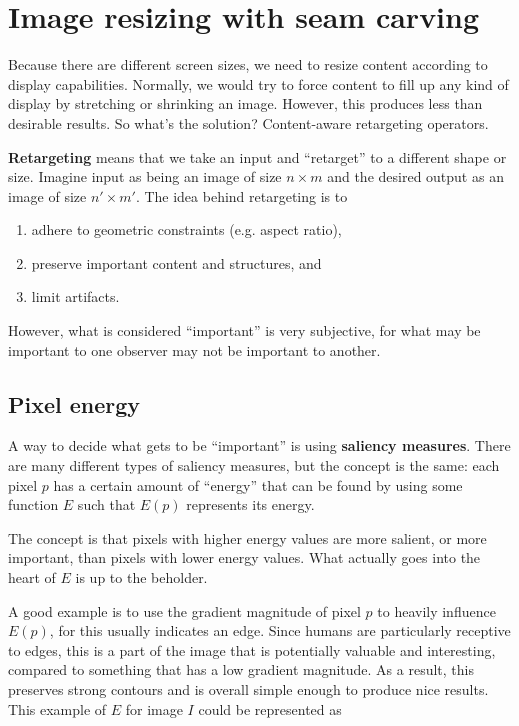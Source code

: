 \documentclass{article}
\begin{document}
\section{Image resizing with seam carving}
Because there are different screen sizes, we need to resize content according to display capabilities. Normally, we would try to force content to fill up any kind of display by stretching or shrinking an image. However, this produces less than desirable results. So what's the solution? Content-aware retargeting operators.

\textbf{Retargeting} means that we take an input and ``retarget'' to a different shape or size. Imagine input as being an image of size $n \times m$ and the desired output as an image of size $n' \times m'$. The idea behind retargeting is to
\begin{enumerate}
	\item adhere to geometric constraints (e.g. aspect ratio),
	\item preserve important content and structures, and
	\item limit artifacts.
\end{enumerate}
However, what is considered ``important'' is very subjective, for what may be important to one observer may not be important to another.

\subsection{Pixel energy}

A way to decide what gets to be ``important'' is using \textbf{saliency measures}. There are many different types of saliency measures, but the concept is the same: each pixel $p$ has a certain amount of ``energy'' that can be found by using some function $E$ such that $E(p)$ represents its energy.

The concept is that pixels with higher energy values are more salient, or more important, than pixels with lower energy values. What actually goes into the heart of $E$ is up to the beholder.

A good example is to use the gradient magnitude of pixel $p$ to heavily influence $E(p)$, for this usually indicates an edge. Since humans are particularly receptive to edges, this is a part of the image that is potentially valuable and interesting, compared to something that has a low gradient magnitude. As a result, this preserves strong contours and is overall simple enough to produce nice results. This example of $E$ for image $I$ could be represented as
\end{document}
